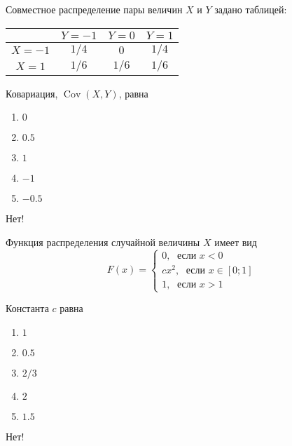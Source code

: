 \documentclass[t]{beamer}
\DeclareMathOperator{\Cov}{Cov}
\begin{document}
 \begin{frame} \label{16-No} 
\begin{block}{16} 

Совместное распределение пары величин $X$ и $Y$ задано таблицей:

\begin{center}
	\begin{tabular}{@{}c|ccc@{}}
		\toprule
		& $Y=-1$ & $Y=0$ & $Y=1$ \\ \midrule
		$X=-1$ & $1/4$  & $0$   & $1/4$ \\
		$X=1$  & $1/6$  & $1/6$ & $1/6$ \\ \bottomrule
	\end{tabular}
\end{center}

\vspace{0.5cm} 
 
 
Ковариация, $\Cov(X,Y)$, равна
 


 \end{block} 
\begin{enumerate} 
\item[] \hyperlink{16-Yes}{\beamergotobutton{} $0$}
\item[] \hyperlink{16-No}{\beamergotobutton{} $0.5$}
\item[] \hyperlink{16-No}{\beamergotobutton{} $1$}
\item[] \hyperlink{16-No}{\beamergotobutton{} $-1$
}
\item[] \hyperlink{16-No}{\beamergotobutton{} $-0.5$}
\end{enumerate} 

 \alert{Нет!} 
\end{frame} 


 \begin{frame} \label{17-No} 
\begin{block}{17} 

Функция распределения случайной величины $X$ имеет вид
\[
F(x)=\begin{cases}
0, \; \text{ если } x<0 \\
cx^2, \; \text{ если } x\in [0;1] \\
1, \; \text{ если } x>1
\end{cases}
\]

\vspace{0.5cm} 
 
 
Константа $c$ равна
 


 \end{block} 
\begin{enumerate} 
\item[] \hyperlink{17-Yes}{\beamergotobutton{} $1$}
\item[] \hyperlink{17-No}{\beamergotobutton{} $0.5$}
\item[] \hyperlink{17-No}{\beamergotobutton{} $2/3$
}
\item[] \hyperlink{17-No}{\beamergotobutton{} $2$}
\item[] \hyperlink{17-No}{\beamergotobutton{} $1.5$}
\end{enumerate} 

 \alert{Нет!} 
\end{frame} 
\end{document}
